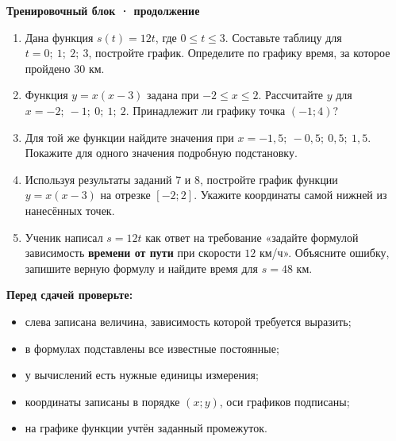 \documentclass[a4paper,12pt]{article}
\begin{document}
\begin{center}
{\LARGE\bfseries\color{darkaccent}Тренировочный блок · продолжение}\end{center}
\begin{enumerate}[label=\textcolor{darkaccent}{\textbf{\arabic*.}},leftmargin=1.5em,start=6,itemsep=10pt]
\item Дана функция \(s(t)=12t\), где \(0\le t\le3\). Составьте таблицу для \(t=0;\ 1;\ 2;\ 3\), постройте график. Определите по графику время, за которое пройдено \(30\) км.
\item Функция \(y=x(x-3)\) задана при \(-2\le x\le2\). Рассчитайте \(y\) для \(x=-2;\ -1;\ 0;\ 1;\ 2\). Принадлежит ли графику точка \((-1;4)\)?
\item Для той же функции найдите значения при \(x=-1{,}5;\ -0{,}5;\ 0{,}5;\ 1{,}5\). Покажите для одного значения подробную подстановку.
\item Используя результаты заданий 7 и 8, постройте график функции \(y=x(x-3)\) на отрезке \([-2;2]\). Укажите координаты самой нижней из нанесённых точек.
\item Ученик написал \(s=12t\) как ответ на требование «задайте формулой зависимость \textbf{времени от пути} при скорости \(12\) км/ч». Объясните ошибку, запишите верную формулу и найдите время для \(s=48\) км.
\end{enumerate}
\vspace{8mm}
\textbf{Перед сдачей проверьте:}
\begin{itemize}[label=\(\square\),leftmargin=1.4em,itemsep=4pt]
\item слева записана величина, зависимость которой требуется выразить;
\item в формулах подставлены все известные постоянные;
\item у вычислений есть нужные единицы измерения;
\item координаты записаны в порядке \((x;y)\), оси графиков подписаны;
\item на графике функции учтён заданный промежуток.
\end{itemize}
\clearpage
\end{document}

